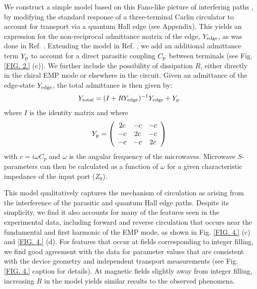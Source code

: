 We construct a simple model based on this Fano-like picture of interfering paths \cite{miroshnichenko2010fano}, by modifying the standard response of a three-terminal Carlin circulator to account for transport via a quantum Hall edge (see Appendix). This yields an expression for the non-reciprocal admittance matrix of the edge, $Y_{\rm edge}$, as was done in Ref. \cite{PhysRevX.4.021019}. Extending the model in Ref. \cite{PhysRevX.4.021019}, we add an additional admittance term $Y_{\rm p}$ to account for a direct parasitic coupling $C_{\rm p}$ between terminals (see Fig. \ref{FIG. 2.} (c)). We further include the possibility of dissipation $R$, either directly in the chiral EMP mode or elsewhere in the circuit. Given an admittance of the edge-state $Y_{\rm edge}$, the total admittance is then given by:
\begin{equation}
	{Y_{{\rm{total}}}} = {({I} + R  Y_{\rm edge})^{ - 1}}Y_{\rm edge} + {Y_{{\rm{p}}}}
\end{equation}
where $I$ is the identity matrix and where
\begin{equation}
{Y_{{\rm{p}}}} = \left( {\begin{array}{*{20}{c}}
{2c}&{ - c}&{ - c}\\
{ - c}&{2c}&{ - c}\\
{ - c}&{ - c}&{2c}
\end{array}} \right)
\end{equation}
with $c = i\omega {C_p}$ and $\omega$ is the angular frequency of the microwaves. Microwave $S$-parameters can then be calculated as a function of $\omega$ for a given characteristic impedance of the input port ($Z_0$).

This model qualitatively captures the mechanism of circulation as arising from the interference of the parasitic and quantum Hall edge paths. Despite its simplicity, we find it also accounts for many of the features seen in the experimental data, including forward and reverse circulation that occurs near the fundamental and first harmonic of the EMP mode, as shown in Fig. \ref{FIG. 4.} (c) and \ref{FIG. 4.} (d). For features that occur at fields corresponding to integer filling, we find good agreement with the data for parameter values that are consistent with the device geometry and independent transport measurements (see Fig. \ref{FIG. 4.} caption for details). At magnetic fields slightly away from integer filling, increasing $R$ in the model yields similar results to the observed phenomena.


